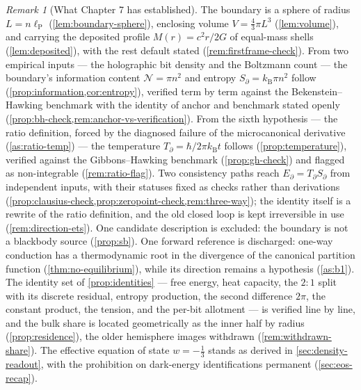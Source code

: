 \documentclass[11pt]{amsbook}
\theoremstyle{plain}
\theoremstyle{definition}
\theoremstyle{remark}
\newtheorem{remark}[theorem]{Remark}
\begin{document}
\begin{remark}[What Chapter 7 has established]\label{rem:ch7summary}
The boundary is a sphere of radius $L = n\ell_{\mathrm P}$ (\cref{lem:boundary-sphere}), enclosing volume $V = \tfrac{4}{3}\pi L^{3}$ (\cref{lem:volume}), and carrying the deposited profile $M(r) = c^{2}r/2G$ of equal-mass shells (\cref{lem:deposited}), with the rest default stated (\cref{rem:firstframe-check}). From two empirical inputs --- the holographic bit density and the Boltzmann count --- the boundary's information content $\mathcal N = \pi n^{2}$ and entropy $S_{\partial} = k_{\mathrm B}\pi n^{2}$ follow (\cref{prop:information,cor:entropy}), verified term by term against the Bekenstein--Hawking benchmark with the identity of anchor and benchmark stated openly (\cref{prop:bh-check,rem:anchor-vs-verification}). From the sixth hypothesis --- the ratio definition, forced by the diagnosed failure of the microcanonical derivative (\cref{as:ratio-temp}) --- the temperature $T_{\partial} = \hbar/2\pi k_{\mathrm B}t$ follows (\cref{prop:temperature}), verified against the Gibbons--Hawking benchmark (\cref{prop:gh-check}) and flagged as non-integrable (\cref{rem:ratio-flag}). Two consistency paths reach $E_{\partial} = T_{\partial}S_{\partial}$ from independent inputs, with their statuses fixed as checks rather than derivations (\cref{prop:clausius-check,prop:zeropoint-check,rem:three-way}); the identity itself is a rewrite of the ratio definition, and the old closed loop is kept irreversible in use (\cref{rem:direction-ets}). One candidate description is excluded: the boundary is not a blackbody source (\cref{prop:sb}). One forward reference is discharged: one-way conduction has a thermodynamic root in the divergence of the canonical partition function (\cref{thm:no-equilibrium}), while its direction remains a hypothesis (\cref{as:b1}). The identity set of \cref{prop:identities} --- free energy, heat capacity, the $2{:}1$ split with its discrete residual, entropy production, the second difference $2\pi$, the constant product, the tension, and the per-bit allotment --- is verified line by line, and the bulk share is located geometrically as the inner half by radius (\cref{prop:residence}), the older hemisphere images withdrawn (\cref{rem:withdrawn-share}). The effective equation of state $w = -\tfrac13$ stands as derived in \cref{sec:density-readout}, with the prohibition on dark-energy identifications permanent (\cref{sec:eos-recap}).


\end{remark}
\end{document}
